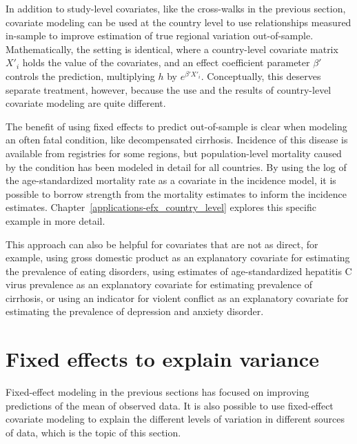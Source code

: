 In addition to study-level covariates, like the cross-walks in the
previous section, covariate modeling can be used at the country level
to use relationships measured in-sample to improve estimation of true
regional variation out-of-sample.  Mathematically, the setting is
identical, where a country-level covariate matrix $X'_i$ holds the
value of the covariates, and an effect coefficient parameter $\beta'$
controls the prediction, multiplying $h$ by $e^{\beta' X'_i}$.
Conceptually, this deserves separate treatment, however, because the
use and the results of country-level covariate modeling are quite different.

The benefit of using fixed effects to predict out-of-sample
is clear when modeling an often fatal condition, like
decompensated cirrhosis.  Incidence of this disease is available from
registries for some regions, but population-level mortality caused by
the condition has been modeled in detail for all
countries.\cite{foreman_modeling_2012} By using the log of the
age-standardized mortality rate as a covariate in the incidence model,
it is possible to borrow strength from the mortality estimates to
inform the incidence
estimates. Chapter~\ref{applications-efx_country_level} explores this
specific example in more detail.

This approach can also be helpful for covariates that are not as
direct, for example, using gross domestic product as an explanatory
covariate for estimating the prevalence of eating disorders, using
estimates of age-standardized hepatitis C virus prevalence as an
explanatory covariate for estimating prevalence of cirrhosis, or using
an indicator for violent conflict as an explanatory covariate for
estimating the prevalence of depression and anxiety disorder.



\section{Fixed effects to explain variance}
Fixed-effect modeling in the previous sections has focused on
improving predictions of the mean of observed data.  It is also
possible to use fixed-effect covariate modeling to explain the
different levels of variation in different sources of data, which is
the topic of this section.

